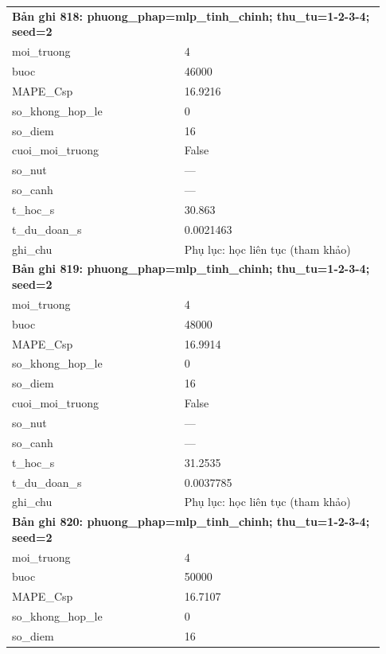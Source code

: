 \begin{longtable}{p{0.43\linewidth}p{0.50\linewidth}}
\midrule
\multicolumn{2}{p{0.95\linewidth}}{\textbf{Bản ghi 818: phuong\_phap=mlp\_tinh\_chinh; thu\_tu=1-2-3-4; seed=2}} \\
moi\_\allowbreak truong & 4 \\
buoc & 46000 \\
MAPE\_\allowbreak Csp & 16.9216 \\
so\_\allowbreak khong\_\allowbreak hop\_\allowbreak le & 0 \\
so\_\allowbreak diem & 16 \\
cuoi\_\allowbreak moi\_\allowbreak truong & False \\
so\_\allowbreak nut & — \\
so\_\allowbreak canh & — \\
t\_\allowbreak hoc\_\allowbreak s & 30.863 \\
t\_\allowbreak du\_\allowbreak doan\_\allowbreak s & 0.0021463 \\
ghi\_\allowbreak chu & Phụ lục: học liên tục (tham khảo) \\
\midrule
\multicolumn{2}{p{0.95\linewidth}}{\textbf{Bản ghi 819: phuong\_phap=mlp\_tinh\_chinh; thu\_tu=1-2-3-4; seed=2}} \\
moi\_\allowbreak truong & 4 \\
buoc & 48000 \\
MAPE\_\allowbreak Csp & 16.9914 \\
so\_\allowbreak khong\_\allowbreak hop\_\allowbreak le & 0 \\
so\_\allowbreak diem & 16 \\
cuoi\_\allowbreak moi\_\allowbreak truong & False \\
so\_\allowbreak nut & — \\
so\_\allowbreak canh & — \\
t\_\allowbreak hoc\_\allowbreak s & 31.2535 \\
t\_\allowbreak du\_\allowbreak doan\_\allowbreak s & 0.0037785 \\
ghi\_\allowbreak chu & Phụ lục: học liên tục (tham khảo) \\
\midrule
\multicolumn{2}{p{0.95\linewidth}}{\textbf{Bản ghi 820: phuong\_phap=mlp\_tinh\_chinh; thu\_tu=1-2-3-4; seed=2}} \\
moi\_\allowbreak truong & 4 \\
buoc & 50000 \\
MAPE\_\allowbreak Csp & 16.7107 \\
so\_\allowbreak khong\_\allowbreak hop\_\allowbreak le & 0 \\
so\_\allowbreak diem & 16 \\

\end{longtable}
